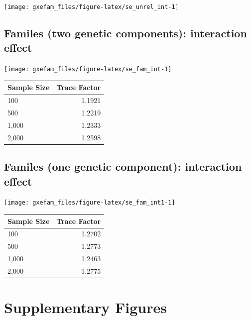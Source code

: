 \documentclass[]{book}
\begin{document}
\begin{center}\texttt{[image: gxefam\_files/figure-latex/se\_unrel\_int-1]} \end{center}

\subsection{Familes (two genetic components): interaction
effect}\label{familes-two-genetic-components-interaction-effect}

\begin{center}\texttt{[image: gxefam\_files/figure-latex/se\_fam\_int-1]} \end{center}

\begin{tabular}{l|r}
\hline
Sample Size & Trace Factor\\
\hline
100 & 1.1921\\
\hline
500 & 1.2219\\
\hline
1,000 & 1.2333\\
\hline
2,000 & 1.2598\\
\hline
\end{tabular}

\subsection{Familes (one genetic component): interaction
effect}\label{familes-one-genetic-component-interaction-effect}

\begin{center}\texttt{[image: gxefam\_files/figure-latex/se\_fam\_int1-1]} \end{center}

\begin{tabular}{l|r}
\hline
Sample Size & Trace Factor\\
\hline
100 & 1.2702\\
\hline
500 & 1.2773\\
\hline
1,000 & 1.2463\\
\hline
2,000 & 1.2775\\
\hline
\end{tabular}

\section{Supplementary Figures}\label{supplementary-figures}
\end{document}
